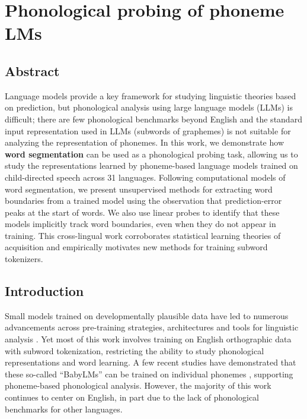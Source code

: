 \chapter{Phonological probing of phoneme LMs}\label{chapter:phonology}

\section{Abstract}

Language models provide a key framework for studying linguistic theories based on prediction, but phonological analysis using large language models (LLMs) is difficult; there are few phonological benchmarks beyond English and the standard input representation used in LLMs (subwords of graphemes) is not suitable for analyzing the representation of phonemes. In this work, we demonstrate how \textbf{word segmentation} can be used as a phonological probing task, allowing us to study the representations learned by phoneme-based language models trained on child-directed speech across 31 languages. Following computational models of word segmentation, we present unsupervised methods for extracting word boundaries from a trained model using the observation that prediction-error peaks at the start of words. We also use linear probes to identify that these models implicitly track word boundaries, even when they do not appear in training. 
This cross-lingual work corroborates statistical learning theories of acquisition and empirically motivates new methods for training subword tokenizers.



\section{Introduction}

Small models trained on developmentally plausible data have led to numerous advancements across pre-training strategies, architectures and tools for linguistic analysis \citep{hu-etal-2024-findings}. Yet most of this work involves training on English orthographic data with subword tokenization, restricting the ability to study phonological representations and word learning. A few recent studies have demonstrated that these so-called ``BabyLMs'' can be trained on individual phonemes \citep{goriely2024babble, bunzeck2024graphemes}, supporting phoneme-based phonological analysis. However, the majority of this work continues to center on English, in part due to the lack of phonological benchmarks for other languages.


